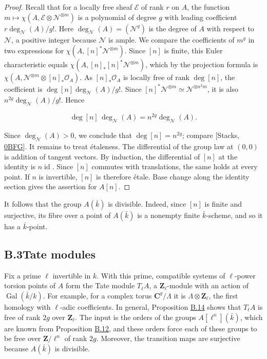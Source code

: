 \documentclass[11pt]{article}
\begin{document}
\begin{proof}[{Proof}]
Recall that for a locally free sheaf \(\mathcal E\) of rank \(r\) on \(A\), the function \(m\mapsto\chi(A,\mathcal E\otimes\mathcal N^{\otimes m})\) is a polynomial of degree \(g\) with leading coefficient \(r\deg_{\mathcal N}(A)/g!\). Here \(\deg_{\mathcal N}(A)=(\mathcal N^g)\) is the degree of \(A\) with respect to \(\mathcal N\), a positive integer because \(\mathcal N\) is ample. We compare the coefficients of \(m^g\) in two expressions for \(\chi(A,[n]^*\mathcal N^{\otimes m})\). Since \([n]\) is finite, this Euler characteristic equals \(\chi(A,[n]_*[n]^*\mathcal N^{\otimes m})\), which by the projection formula is \(\chi(A,\mathcal N^{\otimes m}\otimes[n]_*\mathcal O_A)\). As \([n]_*\mathcal O_A\) is locally free of rank \(\deg[n]\), the coefficient is \(\deg[n]\deg_{\mathcal N}(A)/g!\). Since \([n]^*\mathcal N^{\otimes m}\simeq\mathcal N^{\otimes n^2m}\), it is also \(n^{2g}\deg_{\mathcal N}(A)/g!\). Hence

\[
\deg[n]\,\deg_{\mathcal N}(A)
=n^{2g}\deg_{\mathcal N}(A).
\]

Since \(\deg_{\mathcal N}(A)>0\), we conclude that \(\deg[n]=n^{2g}\); compare [Stacks, \href{https://stacks.math.columbia.edu/tag/0BFG}{0BFG}]. It remains to treat étaleness. The differential of the group law at \((0,0)\) is addition of tangent vectors. By induction, the differential of \([n]\) at the identity is \(n\operatorname{id}\). Since \([n]\) commutes with translations, the same holds at every point. If \(n\) is invertible, \([n]\) is therefore étale. Base change along the identity section gives the assertion for \(A[n]\).
\end{proof}

\label{bp36}%
It follows that the group \(A(\bar k)\) is divisible. Indeed, since \([n]\) is finite and surjective, its fibre over a point of \(A(\bar k)\) is a nonempty finite \(\bar k\)-scheme, and so it has a \(\bar k\)-point.


\subsection*{\texorpdfstring{B.3\quad Tate modules}{B.3 Tate modules}}
\label{bp37}%
\label{bp38}%
Fix a prime \(\ell\) invertible in \(k\). With this prime, compatible systems of \(\ell\)-power torsion points of \(A\) form the Tate module \(T_\ell A\), a \(\mathbf Z_\ell\)-module with an action of \(\operatorname{Gal}(\bar k/k)\). For example, for a complex torus \(\mathbf C^g/\Lambda\) it is \(\Lambda\otimes\mathbf Z_\ell\), the first homology with \(\ell\)-adic coefficients. In general, Proposition \hyperref[bp40]{B.14} shows that \(T_\ell A\) is free of rank \(2g\) over \(\mathbf Z_\ell\). The input is the orders of the groups \(A[\ell^n](\bar k)\), which are known from Proposition \hyperref[bp34]{B.12}, and these orders force each of these groups to be free over \(\mathbf Z/\ell^n\) of rank \(2g\). Moreover, the transition maps are surjective because \(A(\bar k)\) is divisible.
\end{document}
